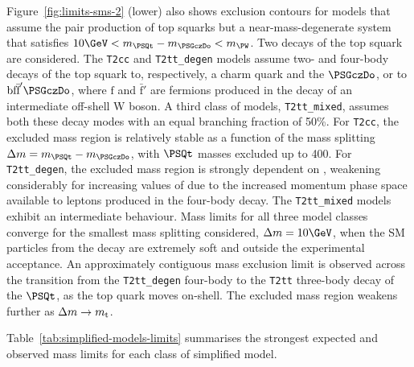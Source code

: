 Figure~\ref{fig:limits-sms-2} (lower) also shows exclusion contours
for models that assume the pair production of top squarks but a
near-mass-degenerate system that satisfies $10\GeV < m_{\PSQt} -
m_{\PSGczDo} < m_\PW$. Two decays of the top squark are
considered.
The \texttt{T2cc} and \texttt{T2tt\_degen} models assume two- and
four-body decays of the top squark to, respectively, a charm quark and
the $\PSGczDo$, or to $\text{bf}\bar{\text{f}}'\PSGczDo$, where
$\text{f}$ and $\bar{\text{f}}'$ are fermions produced in the decay of
an intermediate off-shell W boson. A third class of models,
\texttt{T2tt\_mixed}, assumes both these decay modes with an equal
branching fraction of 50\%. For \texttt{T2cc}, the excluded mass
region is relatively stable as a function of the mass splitting $\dm =
m_{\PSQt} - m_{\PSGczDo}$, with $\PSQt$ masses excluded up to
400\GeV. For \texttt{T2tt\_degen}, the excluded mass region is
strongly dependent on \dm, weakening considerably for increasing
values of \dm due to the increased momentum phase space available to
leptons produced in the four-body decay. The \texttt{T2tt\_mixed}
models exhibit an intermediate behaviour. Mass limits for all three
model classes converge for the smallest mass splitting considered,
$\dm = 10\GeV$, when the SM particles from the \PSQt decay are
extremely soft and outside the experimental acceptance. An
approximately contiguous mass exclusion limit is observed across the
transition from the \texttt{T2tt\_degen} four-body to the
\texttt{T2tt} three-body decay of the $\PSQt$, as the top quark moves
on-shell. The excluded mass region weakens further as $\Delta m \to
m_\text{t}$.

Table~\ref{tab:simplified-models-limits} summarises the strongest
expected and observed mass limits for each class of simplified model. 

